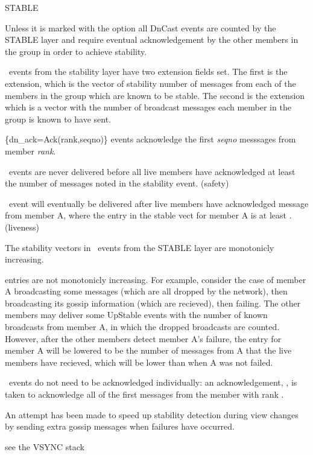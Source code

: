 \begin{Layer}{STABLE}
\begin{Properties}
\item
Unless it is marked with the  option all
DnCast events are counted by the STABLE layer and require eventual
acknowledgement by the other members in the group in order to achieve
stability.
\item
\DnStable\ events from the stability layer have two extension fields
set.  The first is the  extension, which is the
vector of stability number of messages from each of the members in
the group which are known to be stable.  The second is the
 extension which is a vector with the number of
broadcast messages each member in the group is known to have sent.
\item
\DnAck\{dn\_ack=Ack(rank,seqno)\} events acknowledge the first {\em
seqno} messsages from member {\em rank}.
\item
\DnStable\ events are never delivered before all live members have
acknowledged at least the number of messages noted in the stability
event. (safety)
\item
\DnStable\ event will eventually be delivered after live members have
acknowledged message  from member A, where the entry in
the stable vect for member A is at least . (liveness)
\item
The stability vectors in \DnStable\ events from the STABLE layer are
monotonicly increasing.
\end{Properties}

\begin{Notes}
\item
{} entries are not monotonicly increasing.  For example,
consider the case of member A broadcasting some messages (which are
all dropped by the network), then broadcasting its gossip information
(which are recieved), then failing.  The other members may deliver
some UpStable events with the number of known broadcasts from member
A, in which the dropped broadcasts are counted.  However, after the
other members detect member A's failure, the  entry
for member A will be lowered to be the number of messages from A that
the live members have recieved, which will be lower than when A was
not failed.
\item
\UpCast\ events do not need to be acknowledged individually: an
acknowledgement, , is taken to acknowledge all
of the first  messages from the member with rank
.
\item
An attempt has been made to speed up stability detection during view
changes by sending extra gossip messages when failures have occurred.
\end{Notes}

\begin{Sources}
\end{Sources}

\begin{GenEvent}
\genevent{\UpStable}
\genevent{\DnCast}
\genevent{\DnTimer}
\end{GenEvent}

\begin{Testing}
\item see the VSYNC stack
\end{Testing}
\end{Layer}
